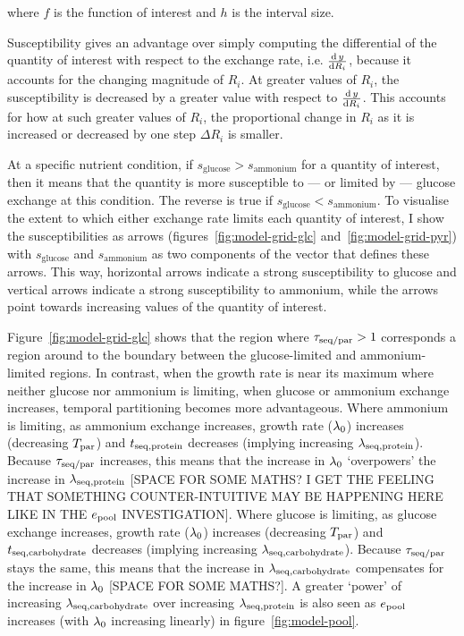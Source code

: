 where $f$ is the function of interest and $h$ is the interval size.

Susceptibility gives an advantage over simply computing the differential of the quantity of interest with respect to the exchange rate, i.e. $\frac{\mathrm{d} \, y}{\mathrm{d} R_{i}}$, because it accounts for the changing magnitude of $R_{i}$.
At greater values of $R_{i}$, the susceptibility is decreased by a greater value with respect to $\frac{\mathrm{d} \, y}{\mathrm{d} R_{i}}$.
This accounts for how at such greater values of $R_{i}$, the proportional change in $R_{i}$ as it is increased or decreased by one step $\Delta R_{i}$ is smaller.

At a specific nutrient condition, if $s_{\mathrm{glucose}} > s_{\mathrm{ammonium}}$ for a quantity of interest, then it means that the quantity is more susceptible to --- or limited by --- glucose exchange at this condition.
The reverse is true if $s_{\mathrm{glucose}} < s_{\mathrm{ammonium}}$.
To visualise the extent to which either exchange rate limits each quantity of interest, I show the susceptibilities as arrows (figures~\ref{fig:model-grid-glc} and~\ref{fig:model-grid-pyr}) with $s_{\mathrm{glucose}}$ and $s_{\mathrm{ammonium}}$ as two components of the vector that defines these arrows.
This way, horizontal arrows indicate a strong susceptibility to glucose and vertical arrows indicate a strong susceptibility to ammonium, while the arrows point towards increasing values of the quantity of interest.

Figure~\ref{fig:model-grid-glc} shows that the region where $\tau_{\mathrm{seq}/\mathrm{par}} > 1$ corresponds a region around to the boundary between the glucose-limited and ammonium-limited regions.
In contrast, when the growth rate is near its maximum where neither glucose nor ammonium is limiting, when glucose or ammonium exchange increases, temporal partitioning becomes more advantageous.
Where ammonium is limiting, as ammonium exchange increases, growth rate ($\lambda_{0}$) increases (decreasing $T_{\mathrm{par}}$) and $t_{\mathrm{seq},\mathrm{protein}}$ decreases (implying increasing $\lambda_{\mathrm{seq},\mathrm{protein}}$).
Because $\tau_{\mathrm{seq}/\mathrm{par}}$ increases, this means that the increase in $\lambda_{0}$ `overpowers' the increase in $\lambda_{\mathrm{seq},\mathrm{protein}}$ [SPACE FOR SOME MATHS?  I GET THE FEELING THAT SOMETHING COUNTER-INTUITIVE MAY BE HAPPENING HERE LIKE IN THE $e_{\mathrm{pool}}$ INVESTIGATION].
Where glucose is limiting, as glucose exchange increases, growth rate ($\lambda_{0}$) increases (decreasing $T_{\mathrm{par}}$) and $t_{\mathrm{seq},\mathrm{carbohydrate}}$ decreases (implying increasing $\lambda_{\mathrm{seq},\mathrm{carbohydrate}}$).
Because $\tau_{\mathrm{seq}/\mathrm{par}}$ stays the same, this means that the increase in $\lambda_{\mathrm{seq},\mathrm{carbohydrate}}$ compensates for the increase in $\lambda_{0}$ [SPACE FOR SOME MATHS?].
A greater `power' of increasing $\lambda_{\mathrm{seq},\mathrm{carbohydrate}}$ over increasing $\lambda_{\mathrm{seq},\mathrm{protein}}$ is also seen as $e_{\mathrm{pool}}$ increases (with $\lambda_{0}$ increasing linearly) in figure~\ref{fig:model-pool}.

